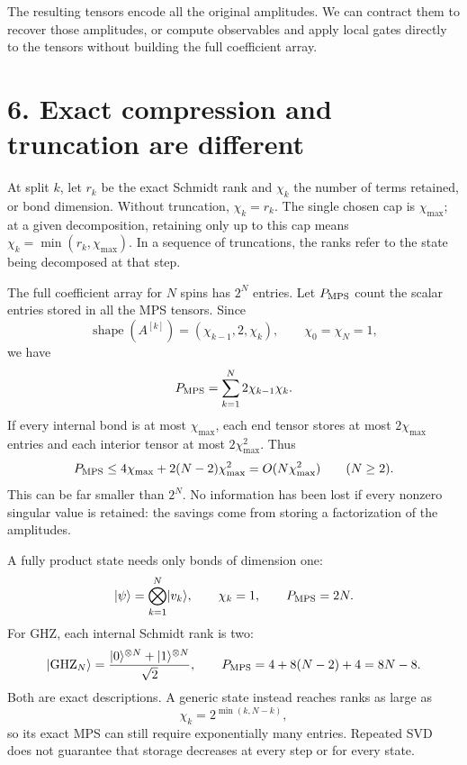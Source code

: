 \documentclass[11pt]{article}
\newcommand{\ket}[1]{\lvert #1\rangle}
\begin{document}
The resulting tensors encode all the original amplitudes. We can contract them to recover those amplitudes, or compute observables and apply local gates directly to the tensors without building the full coefficient array.

\newpage
\section*{6. Exact compression and truncation are different}
At split $k$, let $r_k$ be the exact Schmidt rank and $\chi_k$ the number of terms retained, or bond dimension. Without truncation, $\chi_k=r_k$. The single chosen cap is $\chi_{\max}$; at a given decomposition, retaining only up to this cap means $\chi_k=\min(r_k,\chi_{\max})$. In a sequence of truncations, the ranks refer to the state being decomposed at that step.

The full coefficient array for $N$ spins has $2^N$ entries. Let $P_{\rm MPS}$ count the scalar entries stored in all the MPS tensors. Since
\begin{equation}
\operatorname{shape}(A^{[k]})=(\chi_{k-1},2,\chi_k),
\qquad \chi_0=\chi_N=1,
\end{equation}
we have
\begin{equation}
P_{\rm MPS}=\sum_{k=1}^N2\chi_{k-1}\chi_k.
\end{equation}
If every internal bond is at most $\chi_{\max}$, each end tensor stores at most $2\chi_{\max}$ entries and each interior tensor at most $2\chi_{\max}^2$. Thus
\begin{equation}
P_{\rm MPS}\leq4\chi_{\max}+2(N-2)\chi_{\max}^2
=O(N\chi_{\max}^2)\qquad(N\geq2).
\end{equation}
This can be far smaller than $2^N$. No information has been lost if every nonzero singular value is retained: the savings come from storing a factorization of the amplitudes.

A fully product state needs only bonds of dimension one:
\begin{equation}
\ket\psi=\bigotimes_{k=1}^N\ket{v_k},\qquad
\chi_k=1,\qquad P_{\rm MPS}=2N.
\end{equation}
For GHZ, each internal Schmidt rank is two:
\begin{equation}
\ket{\mathrm{GHZ}_N}=\frac{\ket0^{\otimes N}+\ket1^{\otimes N}}{\sqrt2},
\qquad P_{\rm MPS}=4+8(N-2)+4=8N-8.
\end{equation}
Both are exact descriptions. A generic state instead reaches ranks as large as
\begin{equation}
\chi_k=2^{\min(k,N-k)},
\end{equation}
so its exact MPS can still require exponentially many entries. Repeated SVD does not guarantee that storage decreases at every step or for every state.
\end{document}
